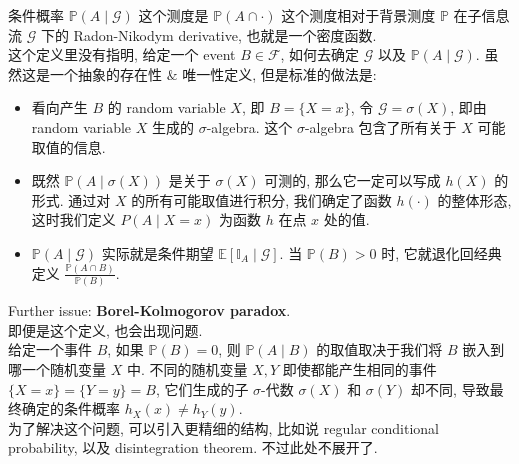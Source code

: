\begin{remark}
    条件概率 \(\mathbb{P}(A \mid \mathcal{G})\) 这个测度是 \(\mathbb{P}(A \cap \cdot)\) 这个测度相对于背景测度 \(\mathbb{P}\) 在子信息流 \(\mathcal{G}\) 下的 Radon-Nikodym derivative, 也就是一个密度函数. \\
    这个定义里没有指明, 给定一个 event \(B \in \mathcal{F}\), 如何去确定 \(\mathcal{G}\) 以及 \(\mathbb{P}(A \mid \mathcal{G})\). 虽然这是一个抽象的存在性 \(\&\) 唯一性定义, 但是标准的做法是:
    \begin{itemize}
        \item  看向产生 \(B\) 的 random variable \(X\), 即 \(B = \{X = x\}\), 令 \(\mathcal{G} = \sigma(X)\), 即由 random variable \(X\) 生成的 \(\sigma\)-algebra. 这个 \(\sigma\)-algebra 包含了所有关于 \(X\) 可能取值的信息.
        \item 既然 $\mathbb{P}(A \mid \sigma(X))$ 是关于 $\sigma(X)$ 可测的, 那么它一定可以写成 $h(X)$ 的形式. 通过对 $X$ 的所有可能取值进行积分, 我们确定了函数 $h(\cdot)$ 的整体形态, 这时我们定义 $P(A \mid X=x)$ 为函数 $h$ 在点 $x$ 处的值.
        \item \(\mathbb{P}(A \mid \mathcal{G})\) 实际就是条件期望 \(\mathbb{E}[\mathbb{I}_A \mid \mathcal{G}]\). 当 \(\mathbb{P}(B) > 0\) 时, 它就退化回经典定义 \( \frac{\mathbb{P}(A \cap B)}{\mathbb{P}(B)}\).
    \end{itemize}
\end{remark}
\begin{remark}
    Further issue: \textbf{Borel-Kolmogorov paradox}.\\
    即便是这个定义, 也会出现问题. \\
    给定一个事件 $B$, 如果 $\mathbb{P}(B)=0$, 则 $\mathbb{P}(A \mid B)$ 的取值取决于我们将 $B$ 嵌入到哪一个随机变量 $X$ 中.
不同的随机变量 $X, Y$ 即使都能产生相同的事件 $\{X=x\} = \{Y=y\} = B$, 它们生成的子 $\sigma$-代数 $\sigma(X)$ 和 $\sigma(Y)$ 却不同, 导致最终确定的条件概率 $h_X(x) \neq h_Y(y)$. \\
为了解决这个问题, 可以引入更精细的结构, 比如说 regular conditional probability, 以及 disintegration theorem. 不过此处不展开了.
\end{remark}

